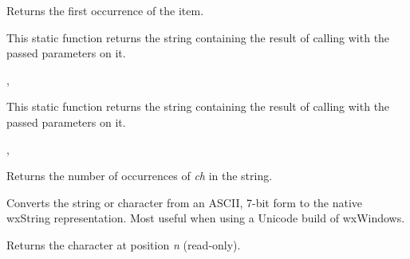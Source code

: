 

Returns the first occurrence of the item.

\label{wxstringformat}


This static function returns the string containing the result of calling 
 with the passed parameters on it.


, 

\label{wxstringformatv}


This static function returns the string containing the result of calling 
 with the passed parameters on it.


, 

\label{wxstringfreq}


Returns the number of occurrences of {\it ch} in the string.

\label{wxstringfromascii}



Converts the string or character from an ASCII, 7-bit form
to the native wxString representation. Most useful when using
a Unicode build of wxWindows.

\label{wxstringgetchar}


Returns the character at position {\it n} (read-only).

\label{wxstringgetdata}


